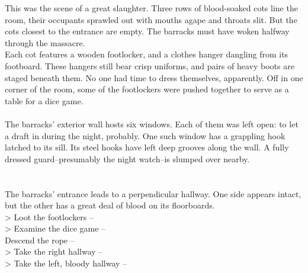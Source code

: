 This was the scene of a great slaughter. Three rows of blood-soaked cots line the room, their occupants sprawled out with mouths agape and throats slit. But the cots closest to the entrance are empty. The barracks must have woken halfway through the massacre.\\

Each cot features a wooden footlocker, and a clothes hanger dangling from its footboard. These hangers still bear crisp uniforms, and pairs of heavy boots are staged beneath them. No one had time to dress themselves, apparently. Off in one corner of the room, some of the footlockers were pushed together to serve as a table for a dice game.\\
\\

The barracks' exterior wall hosts six windows. Each of them was left open: to let a draft in during the night, probably. One such window has a grappling hook latched to its sill. Its steel hooks have left deep grooves along the wall. A fully dressed guard--presumably the night watch--is slumped over nearby. \\
\\
\\

The barracks’ entrance leads to a perpendicular hallway. One side appears intact, but the other has a great deal of blood on its floorboards.\\

> Loot the footlockers -- \\
> Examine the dice game -- \\
 Descend the rope -- \\
> Take the right hallway -- \\
> Take the left, bloody hallway -- 